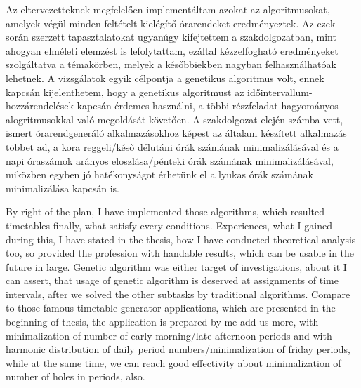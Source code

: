 
Az eltervezetteknek megfelelően implementáltam azokat az algoritmusokat, amelyek végül minden feltételt kielégítő órarendeket eredményeztek. Az ezek során szerzett tapasztalatokat ugyanúgy kifejtettem a szakdolgozatban, mint ahogyan elméleti elemzést is lefolytattam, ezáltal kézzelfogható eredményeket szolgáltatva a témakörben, melyek a későbbiekben nagyban felhasználhatóak lehetnek. A vizsgálatok egyik célpontja a genetikus algoritmus volt, ennek kapcsán kijelenthetem, hogy a genetikus algoritmust az időintervallum-hozzárendelések kapcsán érdemes használni, a többi részfeladat hagyományos alogritmusokkal való megoldását követően. A szakdolgozat elején számba vett, ismert órarendgeneráló alkalmazásokhoz képest az általam készített alkalmazás többet ad, a kora reggeli/késő délutáni órák számának minimalizálásával és a napi óraszámok arányos eloszlása/pénteki órák számának minimalizálásával, miközben egyben jó hatékonyságot érhetünk el a lyukas órák számának minimalizálása kapcsán is.

\newpage


\bigskip

By right of the plan, I have implemented those algorithms, which resulted timetables finally, what satisfy every conditions. Experiences, what I gained during this, I have stated in the thesis, how I have conducted theoretical analysis too, so provided the profession with handable results, which can be usable in the future in large. Genetic algorithm was either target of investigations, about it I can assert, that usage of genetic algorithm is deserved at assignments of time intervals, after we solved the other subtasks by traditional algorithms. Compare to those famous timetable generator applications, which are presented in the beginning of thesis, the application is prepared by me add us more, with minimalization of number of early morning/late afternoon periods and with harmonic distribution of daily period numbers/minimalization of friday periods, while at the same time, we can reach good effectivity about minimalization of number of holes in periods, also.

%
%
%
%
%
%
%
%
%

